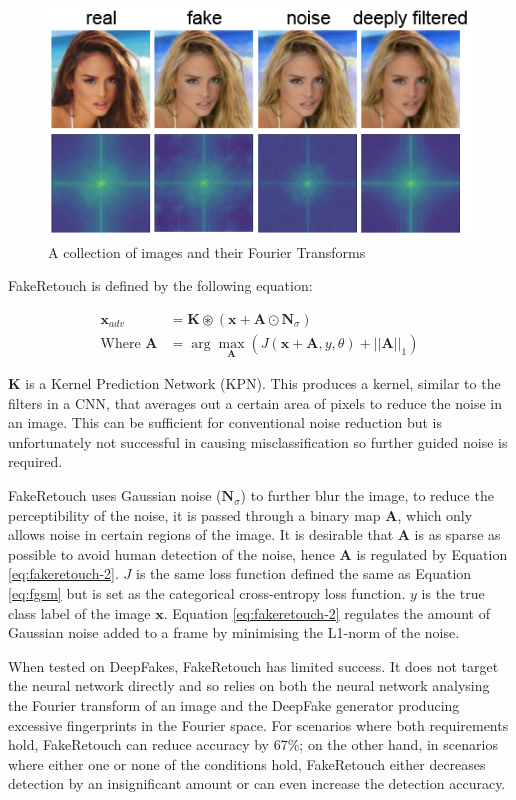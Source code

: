 \begin{figure}[H]
    \centering
    \includegraphics[width=0.5\linewidth]{dissertation//figures/fakeretouch-noise.png}
    \caption{A collection of images and their Fourier Transforms}
    \label{fig:fakeretouch}
\end{figure}

FakeRetouch is defined by the following equation:

\begin{align}
    \mathbf{x}_{adv} &= \mathbf{K} \circledast (\mathbf{x} + \mathbf{A}\odot \mathbf{N}_{\sigma}) \label{eq:fakeretouch-1}\\
    \text{Where } \mathbf{A} &= \arg \max_{\mathbf{A}} \left(J(\mathbf{x}+\mathbf{A},y,\theta)+||\mathbf{A}||_1\right) \label{eq:fakeretouch-2}
\end{align}

$\mathbf{K}$ is a Kernel Prediction Network (KPN)\cite{mildenhall2018burst}. This produces a kernel, similar to the filters in a CNN, that averages out a certain area of pixels to reduce the noise in an image. This can be sufficient for conventional noise reduction but is unfortunately not successful in causing misclassification\cite{huang2020fakeretouch} so further guided noise is required.

FakeRetouch uses Gaussian noise ($\textbf{N}_{\sigma}$) to further blur the image, to reduce the perceptibility of the noise, it is passed through a binary map $\textbf{A}$, which only allows noise in certain regions of the image. It is desirable that $\textbf{A}$ is as sparse as possible to avoid human detection of the noise, hence $\textbf{A}$ is regulated by Equation \ref{eq:fakeretouch-2}. $J$ is the same loss function defined the same as Equation \ref{eq:fgsm} but is set as the categorical cross-entropy loss function. $y$ is the true class label of the image $\textbf{x}$. Equation \ref{eq:fakeretouch-2} regulates the amount of Gaussian noise added to a frame by minimising the L1-norm of the noise.

When tested on DeepFakes, FakeRetouch has limited success. It does not target the neural network directly and so relies on both the neural network analysing the Fourier transform of an image and the DeepFake generator producing excessive fingerprints in the Fourier space. For scenarios where both requirements hold, FakeRetouch can reduce accuracy by 67\%; on the other hand, in scenarios where either one or none of the conditions hold, FakeRetouch either decreases detection by an insignificant amount or can even increase the detection accuracy.

